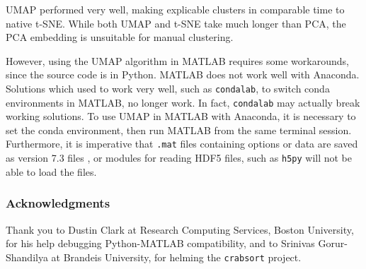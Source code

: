 \documentclass{article}
\begin{document}
UMAP performed very well, making explicable clusters in comparable time to native t-SNE.
While both UMAP and t-SNE take much longer than PCA,
the PCA embedding is unsuitable for manual clustering.

However, using the UMAP algorithm in MATLAB requires some workarounds,
since the source code is in Python.
MATLAB does not work well with Anaconda.
Solutions which used to work very well, such as \texttt{condalab},
to switch conda environments in MATLAB, no longer work.
In fact, \texttt{condalab} may actually break working solutions.
To use UMAP in MATLAB with Anaconda, it is necessary to set the conda environment,
then run MATLAB from the same terminal session.
Furthermore, it is imperative that \texttt{.mat} files containing options or data
are saved as version 7.3 files \autocite{MATFileLevelFile2015},
or modules for reading HDF5 files, such as \texttt{h5py} will not be able to load the files.

\subsubsection*{Acknowledgments}

Thank you to Dustin Clark at Research Computing Services, Boston University,
for his help debugging Python-MATLAB compatibility,
and to Srinivas Gorur-Shandilya at Brandeis University,
for helming the \texttt{crabsort} project.

\printbibliography
\end{document}
